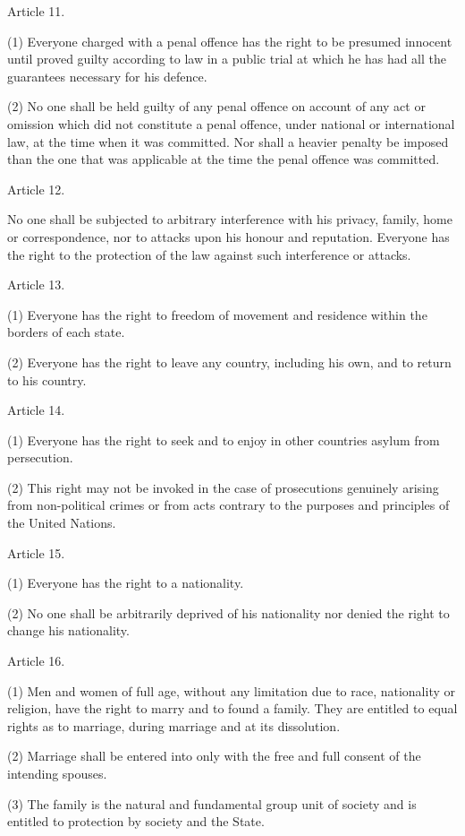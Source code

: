 \documentclass[11pt,a4paper]{article}
\begin{document}
Article 11.

(1) Everyone charged with a penal offence has the right to be presumed innocent until proved guilty according to law in a public trial at which he has had all the guarantees necessary for his defence.

(2) No one shall be held guilty of any penal offence on account of any act or omission which did not constitute a penal offence, under national or international law, at the time when it was committed. Nor shall a heavier penalty be imposed than the one that was applicable at the time the penal offence was committed.

Article 12.

No one shall be subjected to arbitrary interference with his privacy, family, home or correspondence, nor to attacks upon his honour and reputation. Everyone has the right to the protection of the law against such interference or attacks.

Article 13.

(1) Everyone has the right to freedom of movement and residence within the borders of each state.

(2) Everyone has the right to leave any country, including his own, and to return to his country.

Article 14.

(1) Everyone has the right to seek and to enjoy in other countries asylum from persecution.

(2) This right may not be invoked in the case of prosecutions genuinely arising from non-political crimes or from acts contrary to the purposes and principles of the United Nations.

Article 15.

(1) Everyone has the right to a nationality.

(2) No one shall be arbitrarily deprived of his nationality nor denied the right to change his nationality.

Article 16.

(1) Men and women of full age, without any limitation due to race, nationality or religion, have the right to marry and to found a family. They are entitled to equal rights as to marriage, during marriage and at its dissolution.

(2) Marriage shall be entered into only with the free and full consent of the intending spouses.

(3) The family is the natural and fundamental group unit of society and is entitled to protection by society and the State.
\end{document}

